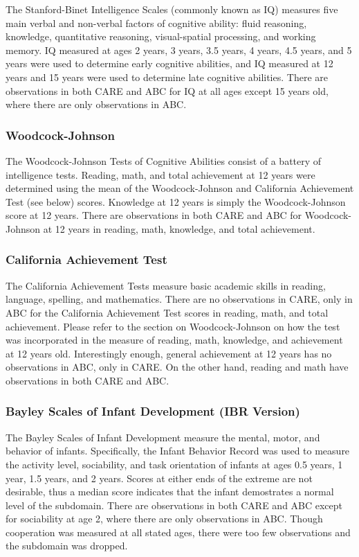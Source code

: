   The Stanford-Binet Intelligence Scales (commonly known as IQ) measures five main verbal and non-verbal factors of cognitive ability: fluid reasoning, knowledge, quantitative reasoning, visual-spatial processing, and working memory. IQ measured at ages 2 years, 3 years, 3.5 years, 4 years, 4.5 years, and 5 years were used to determine early cognitive abilities, and IQ measured at 12 years and 15 years were used to determine late cognitive abilities. There are observations in both CARE and ABC for IQ at all ages except 15 years old, where there are only observations in ABC.

  \subsubsection{Woodcock-Johnson}

  The Woodcock-Johnson Tests of Cognitive Abilities consist of a battery of intelligence tests. Reading, math, and total achievement at 12 years were determined using the mean of the Woodcock-Johnson and California Achievement Test (see below) scores. Knowledge at 12 years is simply the Woodcock-Johnson score at 12 years. There are observations in both CARE and ABC for Woodcock-Johnson at 12 years in reading, math, knowledge, and total achievement.  

  \subsubsection{California Achievement Test}

  The California Achievement Tests measure basic academic skills in reading, language, spelling, and mathematics. There are no observations in CARE, only in ABC for the California Achievement Test scores in reading, math, and total achievement. Please refer to the section on Woodcock-Johnson on how the test was incorporated in the measure of reading, math, knowledge, and achievement at 12 years old. Interestingly enough, general achievement at 12 years has no observations in ABC, only in CARE. On the other hand, reading and math have observations in both CARE and ABC.

  \subsubsection{Bayley Scales of Infant Development (IBR Version)}

  The Bayley Scales of Infant Development measure the mental, motor, and behavior of infants. Specifically, the Infant Behavior Record was used to measure the activity level, sociability, and task orientation of infants at ages 0.5 years, 1 year, 1.5 years, and 2 years. Scores at either ends of the extreme are not desirable, thus a median score indicates that the infant demostrates a normal level of the subdomain. There are observations in both CARE and ABC except for sociability at age 2, where there are only observations in ABC. Though cooperation was measured at all stated ages, there were too few observations and the subdomain was dropped.

